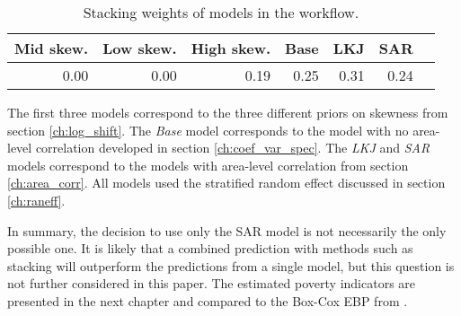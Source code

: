 \begin{table}[ht]
    \caption{Stacking weights of models in the workflow.}
    \begin{center}
        \begin{tabular}{rrrrrrr}
          \hline
         Mid skew. & Low skew. & High skew. & Base & LKJ & SAR \\
          \hline
         0.00 & 0.00 & 0.19 & 0.25 & 0.31 & 0.24 \\
           \hline
        \end{tabular}
    \end{center}

    \begin{adjustwidth}{45pt}{45pt}
        \footnotesize{The first three models correspond to the three different priors on skewness from section \ref{ch:log_shift}. The \textit{Base} model corresponds to the model with no area-level correlation developed in section \ref{ch:coef_var_spec}. The \textit{LKJ} and \textit{SAR} models correspond to the models with area-level correlation from section \ref{ch:area_corr}. All models used the stratified random effect discussed in section \ref{ch:raneff}.}
    \end{adjustwidth}
    \label{tab:stacking}
\end{table}

In summary, the decision to use only the SAR model is not necessarily the only possible one.
It is likely that a combined prediction with methods such as stacking will outperform the predictions from a single model, but this question is not further considered in this paper.
The estimated poverty indicators are presented in the next chapter and compared to the Box-Cox EBP from \cite{rojas_perilla_data_2020}.

